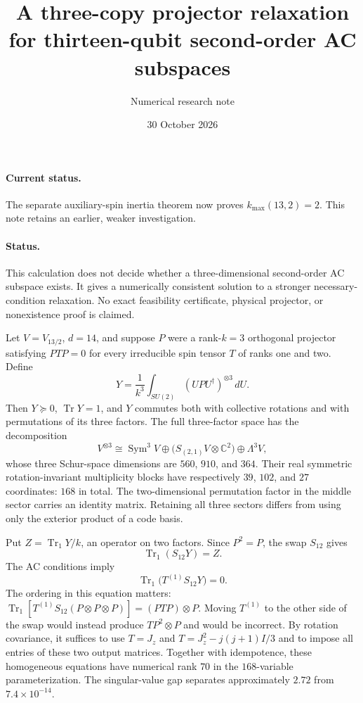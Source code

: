 \documentclass[11pt]{article}
\newcommand{\Tr}{\operatorname{Tr}}
\begin{document}
\paragraph{Current status.} The separate auxiliary-spin inertia theorem now proves $k_{\max}(13,2)=2$. This note retains an earlier, weaker investigation.

\title{A three-copy projector relaxation for thirteen-qubit second-order AC subspaces}
\author{Numerical research note}
\date{30 October 2026}
\maketitle
\paragraph{Status.} This calculation does not decide whether a three-dimensional second-order AC subspace exists. It gives a numerically consistent solution to a stronger necessary-condition relaxation. No exact feasibility certificate, physical projector, or nonexistence proof is claimed.

Let $V=V_{13/2}$, $d=14$, and suppose $P$ were a rank-$k=3$ orthogonal projector satisfying $PTP=0$ for every irreducible spin tensor $T$ of ranks one and two. Define
\[
Y=\frac{1}{k^3}\int_{SU(2)}(UPU^\dagger)^{\otimes3}\,dU.
\]
Then $Y\succeq0$, $\Tr Y=1$, and $Y$ commutes both with collective rotations and with permutations of its three factors. The full three-factor space has the decomposition
\[
V^{\otimes3}\cong\operatorname{Sym}^3V\oplus
\bigl(S_{(2,1)}V\otimes\mathbb C^2\bigr)\oplus\Lambda^3V,
\]
whose three Schur-space dimensions are $560$, $910$, and $364$. Their real symmetric rotation-invariant multiplicity blocks have respectively $39$, $102$, and $27$ coordinates: $168$ in total. The two-dimensional permutation factor in the middle sector carries an identity matrix. Retaining all three sectors differs from using only the exterior product of a code basis.

Put $Z=\Tr_1Y/k$, an operator on two factors. Since $P^2=P$, the swap $S_{12}$ gives
\[
\Tr_1(S_{12}Y)=Z.
\]
The AC conditions imply
\[
\Tr_1\bigl(T^{(1)}S_{12}Y\bigr)=0.
\]
The ordering in this equation matters: $\Tr_1[T^{(1)}S_{12}(P\otimes P\otimes P)]=(PTP)\otimes P$. Moving $T^{(1)}$ to the other side of the swap would instead produce $TP^2\otimes P$ and would be incorrect. By rotation covariance, it suffices to use $T=J_z$ and $T=J_z^2-j(j+1)I/3$ and to impose all entries of these two output matrices. Together with idempotence, these homogeneous equations have numerical rank $70$ in the $168$-variable parameterization. The singular-value gap separates approximately $2.72$ from $7.4\times10^{-14}$.
\end{document}
